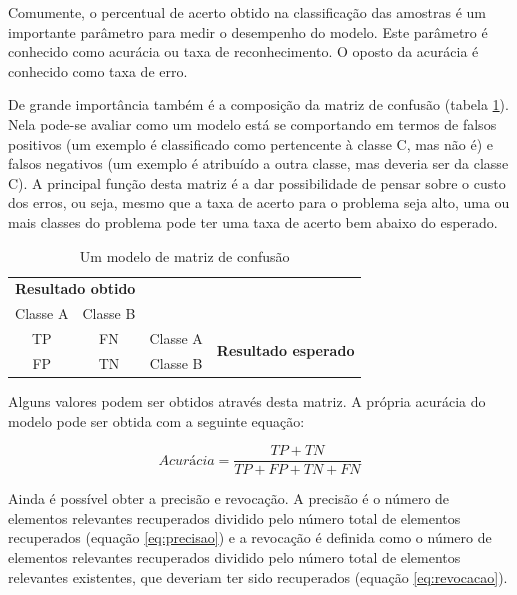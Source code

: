 Comumente, o percentual de acerto obtido na classificação das amostras é um importante parâmetro para medir o desempenho do modelo. Este parâmetro é conhecido como acurácia ou taxa de reconhecimento. O oposto da acurácia é conhecido como taxa de erro.

De grande importância também é a composição da matriz de confusão (tabela \ref{tab:matrixConfusao}). Nela pode-se avaliar como um modelo está se comportando em termos de falsos positivos (um exemplo é classificado como pertencente à classe C, mas não é) e falsos negativos (um exemplo é atribuído a outra classe, mas deveria ser da classe C). A principal função desta matriz é a dar possibilidade de pensar sobre o custo dos erros, ou seja, mesmo que a taxa de acerto para o problema seja alto, uma ou mais classes do problema pode ter uma taxa de acerto bem abaixo do esperado.

\begin{table}[h]
  \centering
  \begin{tabular}{cccc}
  \multicolumn{2}{c}{\textbf{Resultado obtido}}                  &                               &                                              \\ \cline{1-2}
  \multicolumn{1}{|c|}{Classe A} & \multicolumn{1}{c|}{Classe B} &                               &                                              \\ \cline{1-3}
  \multicolumn{1}{|c|}{TP}       & \multicolumn{1}{c|}{FN}       & \multicolumn{1}{c|}{Classe A} & \multirow{2}{*}{\textbf{Resultado esperado}} \\ \cline{1-3}
  \multicolumn{1}{|c|}{FP}       & \multicolumn{1}{c|}{TN}       & \multicolumn{1}{c|}{Classe B} &                                              \\ \cline{1-3}
  \end{tabular}
  \caption{Um modelo de matriz de confusão}
  \label{tab:matrixConfusao}
\end{table}

Alguns valores podem ser obtidos através desta matriz. A própria acurácia do modelo pode ser obtida com a seguinte equação:

\begin{equation}
  Acurácia = \frac{TP+TN}{TP+FP+TN+FN}
\label{eq:acuracia}
\end{equation}

Ainda é possível obter a precisão e revocação. A precisão é o número de elementos relevantes recuperados dividido pelo número total de elementos recuperados (equação \ref{eq:precisao}) e a revocação é definida como o número de elementos relevantes recuperados dividido pelo número total de elementos relevantes existentes, que deveriam ter sido recuperados (equação \ref{eq:revocacao}).

